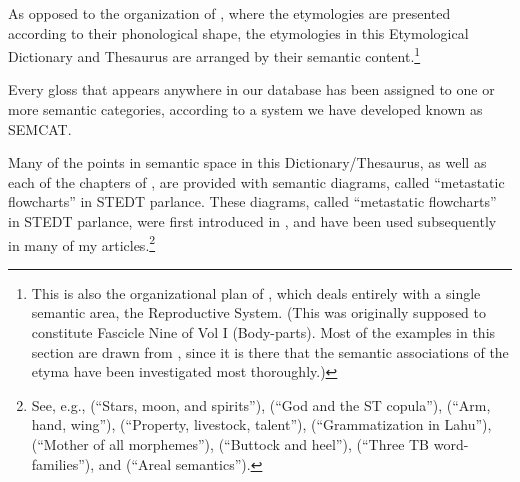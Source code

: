 As opposed to the organization of \textit{}, where the etymologies are presented according to their phonological shape, the etymologies in this Etymological Dictionary and Thesaurus are arranged by their semantic content.\footnote{This is also the organizational plan of \textit{}, which deals entirely with a single semantic area, the Reproductive System. (This was originally supposed to constitute Fascicle Nine of Vol I (Body-parts). Most of the examples in this section are drawn from \textit{}, since it is there that the semantic associations of the etyma have been investigated most thoroughly.)}

 Every gloss that appears anywhere in our database has been assigned to one or more semantic categories, according to a system we have developed known as SEMCAT.

Many of the points in semantic space in this Dictionary/Thesaurus, as well as each of the chapters of \textit{}, are provided with semantic diagrams, called “metastatic flowcharts” in STEDT parlance. These diagrams, called
“metastatic flowcharts” in STEDT parlance, were first introduced in \textit{},
and have been used subsequently in many of my articles.\footnote{See, e.g.,
\citealt{JAM-SMS} (“Stars, moon, and spirits”), \citeyear{JAM-GSTC} (“God and the ST copula”),
\citeyear{JAM-AHWST} (“Arm, hand, wing”), \citeyear{JAM-USAI} (“Property, livestock, talent”), \citeyear{JAM-AUD}
(“Grammatization in Lahu”), \citeyear{JAM-MOAM} (“Mother of all morphemes”), \citeyear{JAM-DBH} (“Buttock
and heel”), \citeyear{JAM-3WF} (“Three TB word-families”), and \citeyear{JAM-AS} (“Areal semantics”).}

